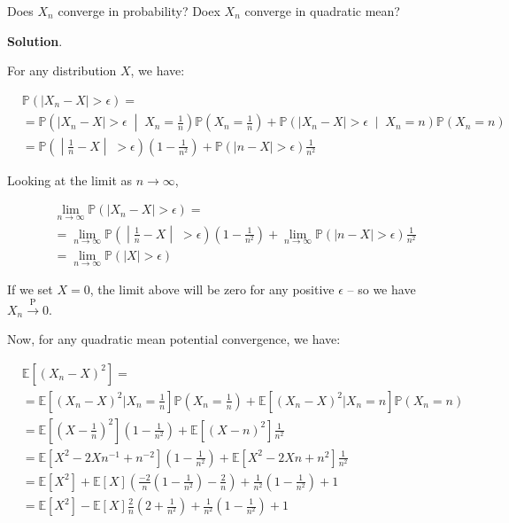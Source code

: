Does \(X_{n}\) converge in probability? Doex \(X_{n}\) converge in quadratic
mean?

\textbf{Solution}.

For any distribution \(X\), we have:

\begin{align*}
& \mathbb{P}( |X_{n} - X| > \epsilon ) = \\
&= \mathbb{P}\left( |X_{n} - X| > \epsilon \;\middle|\; X_{n} = \frac{1}{n} \right)\mathbb{P}\left(X_{n} = \frac{1}{n}\right)
  + \mathbb{P}\left( |X_{n} - X| > \epsilon \;\middle|\; X_{n} = n \right)\mathbb{P}\left(X_{n} = n\right) \\
&= \mathbb{P}\left( \middle|\frac{1}{n} - X\middle|\; > \epsilon \right)\left(1 - \frac{1}{n^{2}} \right)
  + \mathbb{P}\left( |n - X| > \epsilon \right)\frac{1}{n^{2}}
\end{align*}

Looking at the limit as \(n \rightarrow \infty\),

\begin{align*}
& \lim _{n \rightarrow \infty} \mathbb{P}( |X_{n} - X| > \epsilon ) = \\
& = \lim _{n \rightarrow \infty} \mathbb{P}\left( \middle|\frac{1}{n} - X\middle|\; > \epsilon \right)\left(1 - \frac{1}{n^{2}} \right)
  + \lim _{n \rightarrow \infty} \mathbb{P}\left( |n - X| > \epsilon \right)\frac{1}{n^{2}} \\
& = \lim _{n \rightarrow \infty} \mathbb{P}\left( |X| > \epsilon \right)
\end{align*}

If we set \(X = 0\), the limit above will be zero for any positive
\(\epsilon\) -- so we have \(X_{n} \xrightarrow{\text{P}} 0\).

Now, for any quadratic mean potential convergence, we have:

\begin{align*}
& \mathbb{E}\left[(X_{n} - X)^{2}\right] = \\
& = \mathbb{E}\left[(X_{n} - X)^{2} \bigg| X_{n} = \frac{1}{n} \right] \mathbb{P}\left(X_{n} = \frac{1}{n}\right)
   + \mathbb{E}\left[(X_{n} - X)^{2} \big| X_{n} = n \right] \mathbb{P}\left(X_{n} = n\right) \\
& = \mathbb{E}\left[\left(X - \frac{1}{n}\right)^{2}  \right] \left(1 - \frac{1}{n^{2}}\right)
   + \mathbb{E}\left[(X - n)^{2}  \right] \frac{1}{n^{2}} \\
& = \mathbb{E}\left[X^{2} - 2Xn^{-1} + n^{-2} \right] \left(1 - \frac{1}{n^{2}}\right)
   + \mathbb{E}\left[X^{2} - 2Xn + n^{2} \right] \frac{1}{n^{2}} \\
& = \mathbb{E}\left[X^{2}\right] + \mathbb{E}\left[X\right] \left(\frac{-2}{n} \left(1 - \frac{1}{n^{2}} \right) -\frac{2}{n}\right) + \frac{1}{n^{2}} \left(1 - \frac{1}{n^{2}} \right) + 1 \\
& = \mathbb{E}\left[X^{2}\right] - \mathbb{E}\left[X\right] \frac{2}{n} \left( 2 + \frac{1}{n^{2}} \right) + \frac{1}{n^{2}} \left(1 - \frac{1}{n^{2}} \right) + 1
\end{align*}

